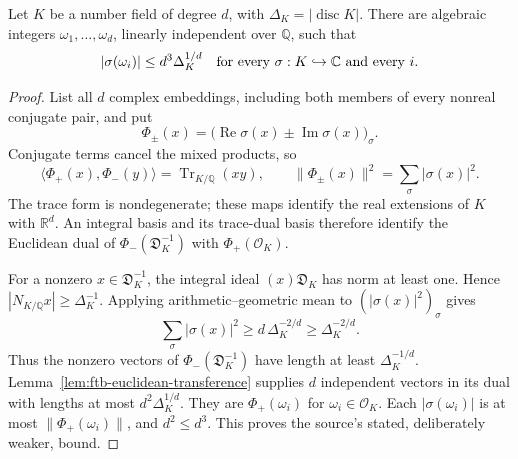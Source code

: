 \begin{srlemma}
\label{lem:ftb-short-integers}
Let \(K\) be a number field of degree \(d\), with
\(\Delta_K=|\operatorname{disc}K|\).
There are algebraic integers \(\omega_1,\ldots,\omega_d\), linearly
independent over \(\mathbb Q\), such that
\[
 |\sigma(\omega_i)|\le d^3\Delta_K^{1/d}
 \quad\hbox{for every }\sigma:K\hookrightarrow\mathbb C
 \hbox{ and every }i .
\]
\end{srlemma}
\begin{proof}
List all \(d\) complex embeddings, including both members of every
nonreal conjugate pair, and put
\[
 \Phi_\pm(x)=
       \bigl(\operatorname{Re}\sigma(x)
                   \pm\operatorname{Im}\sigma(x)\bigr)_\sigma .
\]
Conjugate terms cancel the mixed products, so
\[
 \langle\Phi_+(x),\Phi_-(y)\rangle
       =\operatorname{Tr}_{K/\mathbb Q}(xy),\qquad
 \|\Phi_\pm(x)\|^2=\sum_\sigma|\sigma(x)|^2 .
\]
The trace form is nondegenerate; these maps identify the real
extensions of \(K\) with \(\mathbb R^d\).
An integral basis and its trace-dual basis therefore identify the
Euclidean dual of
\(\Phi_-(\mathfrak D_K^{-1})\) with \(\Phi_+(\mathcal O_K)\).

For a nonzero \(x\in\mathfrak D_K^{-1}\), the integral ideal
\((x)\mathfrak D_K\) has norm at least one.  Hence
\(|N_{K/\mathbb Q}x|\ge\Delta_K^{-1}\).
Applying arithmetic--geometric mean to
\((|\sigma(x)|^2)_\sigma\) gives
\[
 \sum_\sigma|\sigma(x)|^2
       \ge d\,\Delta_K^{-2/d}\ge\Delta_K^{-2/d}.
\]
Thus the nonzero vectors of
\(\Phi_-(\mathfrak D_K^{-1})\) have length at least
\(\Delta_K^{-1/d}\).  Lemma~\ref{lem:ftb-euclidean-transference}
supplies \(d\) independent vectors in its dual with lengths at most
\(d^2\Delta_K^{1/d}\).  They are \(\Phi_+(\omega_i)\) for
\(\omega_i\in\mathcal O_K\).
Each \(|\sigma(\omega_i)|\) is at most
\(\|\Phi_+(\omega_i)\|\), and \(d^2\le d^3\).
This proves the source's stated, deliberately weaker, bound.
\end{proof}

